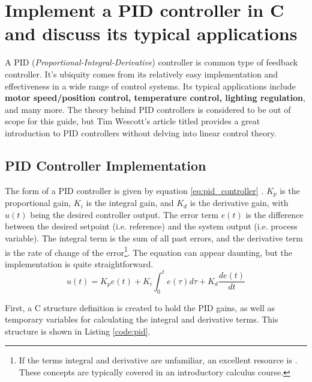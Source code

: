 \documentclass[main.tex]{subfiles}
\begin{document}
\section{Implement a PID controller in C and discuss its typical applications} \label{section:pid} 

\spoilerline

\noindent A PID (\textit{Proportional-Integral-Derivative}) controller is common type of feedback controller. It's ubiquity comes from its relatively easy implementation and effectiveness in a wide range of control systems. Its typical applications include \textbf{motor speed/position control, temperature control, lighting regulation}, and many more. The theory behind PID controllers is considered to be out of scope for this guide, but Tim Wescott's article titled  provides a great introduction to PID controllers without delving into linear control theory.

\subsection{PID Controller Implementation}
The form of a PID controller is given by equation \eqref{eq:pid_controller} \cite{AbramovitchPID}. $K_p$ is the proportional gain, $K_i$ is the integral gain, and $K_d$ is the derivative gain, with $u(t)$ being the desired controller output. The error term $e(t)$ is the difference between the desired setpoint (i.e. reference) and the system output (i.e. process variable). The integral term is the sum of all past errors, and the derivative term is the rate of change of the error\footnote{If the terms integral and derivative are unfamiliar, an excellent resource is . These concepts are typically covered in an introductory calculus course.}. The equation can appear daunting, but the implementation is quite straightforward.
\begin{equation}
    u(t) = K_p e(t) + K_i \int_{0}^{t} e(\tau) d\tau + K_d \frac{de(t)}{dt}
    \label{eq:pid_controller}
\end{equation}

\noindent First, a C structure definition is created to hold the PID gains, as well as temporary variables for calculating the integral and derivative terms. This structure is shown in Listing \ref{code:pid}.

\end{document}
